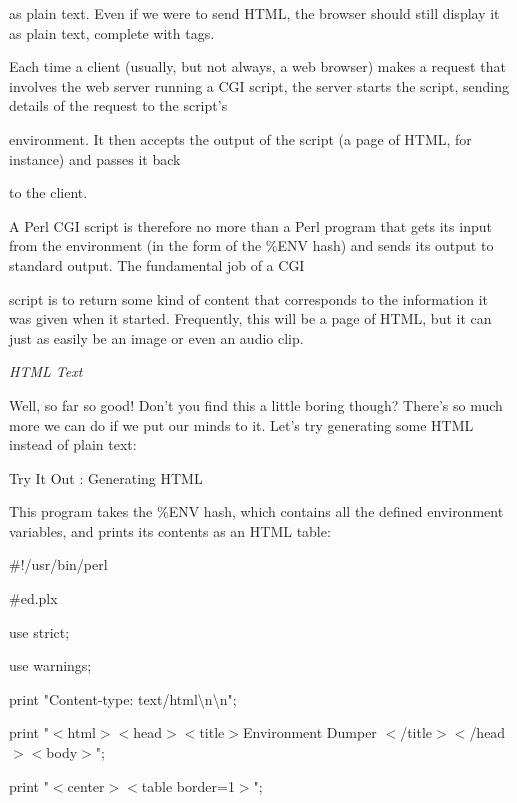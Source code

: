 \documentclass[a4paper,11pt]{book}
\begin{document}
\noindent as plain text. Even if we were to send HTML, the browser should still display it as plain text, complete with tags.

\noindent 

\noindent Each time a client (usually, but not always, a web browser) makes a request that involves the web server running a CGI script, the server starts the script, sending details of the request to the script's

\noindent environment. It then accepts the output of the script (a page of HTML, for instance) and passes it back

\noindent to the client.

\noindent 

\noindent A Perl CGI script is therefore no more than a Perl program that gets its input from the environment (in the form of the \%ENV hash) and sends its output to standard output. The fundamental job of a CGI

\noindent script is to return some kind of content that corresponds to the information it was given when it started. Frequently, this will be a page of HTML, but it can just as easily be an image or even an audio clip.

\noindent 

\noindent \textit{HTML Text}

\noindent Well, so far so good! Don't you find this a little boring though? There's so much more we can do if we put our minds to it. Let's try generating some HTML instead of plain text:

\noindent 

\noindent Try It Out : Generating HTML

\noindent This program takes the \%ENV hash, which contains all the defined environment variables, and prints its contents as an HTML table:

\noindent 

\noindent \#!/usr/bin/perl

\noindent \#ed.plx

\noindent use strict;

\noindent use warnings;

\noindent 

\noindent 

\noindent print "Content-type: text/html\textbackslash n\textbackslash n";

\noindent print "$<$html$>$$<$head$>$$<$title$>$Environment Dumper $<$/title$>$$<$/head$>$$<$body$>$";

\noindent print "$<$center$>$$<$table border=1$>$";
\end{document}

